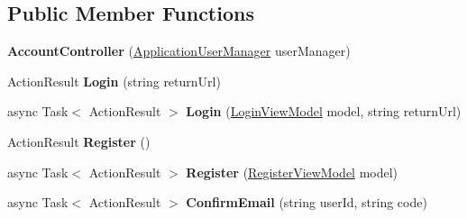 \subsection*{Public Member Functions}
\begin{DoxyCompactItemize}
\item 
{\bfseries Account\+Controller} (\hyperlink{class_p_c_builder_m_v_c_1_1_application_user_manager}{Application\+User\+Manager} user\+Manager)\hypertarget{class_p_c_builder_m_v_c_1_1_controllers_1_1_account_controller_a3df29313acdd6591b5873bb9bdb67b71}{}\label{class_p_c_builder_m_v_c_1_1_controllers_1_1_account_controller_a3df29313acdd6591b5873bb9bdb67b71}

\item 
Action\+Result {\bfseries Login} (string return\+Url)\hypertarget{class_p_c_builder_m_v_c_1_1_controllers_1_1_account_controller_ae380c072ed2c6c2f2aa3ec143d06069a}{}\label{class_p_c_builder_m_v_c_1_1_controllers_1_1_account_controller_ae380c072ed2c6c2f2aa3ec143d06069a}

\item 
async Task$<$ Action\+Result $>$ {\bfseries Login} (\hyperlink{class_p_c_builder_m_v_c_1_1_models_1_1_login_view_model}{Login\+View\+Model} model, string return\+Url)\hypertarget{class_p_c_builder_m_v_c_1_1_controllers_1_1_account_controller_ae54dbd2be5908155b37a0c7a76bb022d}{}\label{class_p_c_builder_m_v_c_1_1_controllers_1_1_account_controller_ae54dbd2be5908155b37a0c7a76bb022d}

\item 
Action\+Result {\bfseries Register} ()\hypertarget{class_p_c_builder_m_v_c_1_1_controllers_1_1_account_controller_a92aa1b746f1a5607e2667ce98f2efed9}{}\label{class_p_c_builder_m_v_c_1_1_controllers_1_1_account_controller_a92aa1b746f1a5607e2667ce98f2efed9}

\item 
async Task$<$ Action\+Result $>$ {\bfseries Register} (\hyperlink{class_p_c_builder_m_v_c_1_1_models_1_1_register_view_model}{Register\+View\+Model} model)\hypertarget{class_p_c_builder_m_v_c_1_1_controllers_1_1_account_controller_abc856a6c8ee0bd33cff9bacee36fedfe}{}\label{class_p_c_builder_m_v_c_1_1_controllers_1_1_account_controller_abc856a6c8ee0bd33cff9bacee36fedfe}

\item 
async Task$<$ Action\+Result $>$ {\bfseries Confirm\+Email} (string user\+Id, string code)\hypertarget{class_p_c_builder_m_v_c_1_1_controllers_1_1_account_controller_a6aed0b4d63a8ff3d35b1428451a15e7b}{}\label{class_p_c_builder_m_v_c_1_1_controllers_1_1_account_controller_a6aed0b4d63a8ff3d35b1428451a15e7b}


\end{DoxyCompactItemize}
